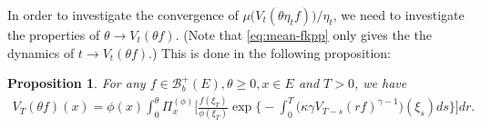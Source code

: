 \documentclass[12pt,a4paper]{amsart}
\newtheorem{prop}[thm]{Proposition}
\theoremstyle{definition}
\numberwithin{equation}{section}
\begin{document}
In order to investigate the convergence of $\mu\big( V_t(\theta \eta_t f) \big)/ \eta_t$, we need to investigate the properties of $\theta\to V_t(\theta f)$.
(Note that \eqref{eq:mean-fkpp} only gives the the dynamics of $t\to V_t(\theta f)$.)
This is done in the following proposition:

\begin{prop}
	For any $f\in \mathscr B^+_b(E),\theta \geq 0,x\in E$ and $T>0$, we have
\begin{align}\label{eq: equation for Vt(theta f) for theta}
	V_T ( \theta f) ( x)
	= \phi( x) \int_0^\theta \Pi_x^{(\phi)} \Big[ \frac{ f(\xi_T) } { \phi(\xi_T) } \exp\Big\{ - \int_0^T \big( \kappa \gamma V_{T-s} (r f)^{ \gamma - 1} \big) ( \xi_s) ds\Big\} \Big] dr.
\end{align}
\end{prop}
\end{document}
